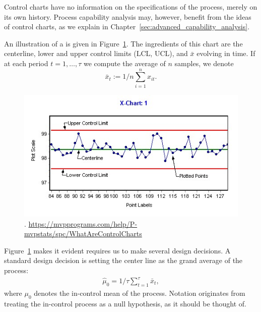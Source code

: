 \begin{remark}
Control charts have no information on the specifications of the process, merely on its own history.
Process capability analysis may, however, benefit from the ideas of control charts, as we explain in Chapter~\ref{sec:advanced_capability_analysis}.
\end{remark}


An illustration of a \barxChart is given in Figure~\ref{fig:bar_x_chart}. 
The ingredients of this chart are the centerline, lower and upper control limits (LCL, UCL), and $\bar{x}$ evolving in time. 
If at each period $t=1,\dots,\tau$ we compute the average of $n$ samples, we denote $$\bar{x}_t:=1/n \sum_{i=1}^n x_{it}.$$

\begin{figure}[ht]
\centering
\includegraphics[height=0.3\textheight]{art/X-chartExample}
\caption[\barxChart]{\barxChart. \newline \url{https://mvpprograms.com/help/P-mvpstats/spc/WhatAreControlCharts}}
\label{fig:bar_x_chart}
\end{figure}



Figure~\ref{fig:bar_x_chart} makes it evident \barxChart requires us to make several design decisions.
A standard design decision is setting the center line as the grand average of the process: 
\begin{align}
\label{eq:centerline}
	\hat{\mu}_0=1/\tau \sum_{t=1}^\tau \bar{x}_t,
\end{align}
where $\mu_0$ denotes the in-control mean of the process. 
Notation originates from treating the in-control process as a null hypothesis, as it should be thought of.


